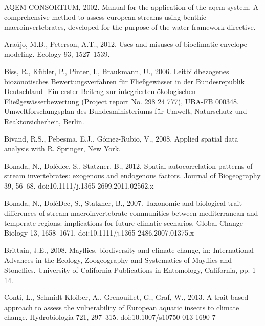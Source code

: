\openleft

\begingroup

\renewcommand{\addcontentsline}[3]{}%

\begin{thebibliography}

\bibitem{} \hangindent=1cm AQEM CONSORTIUM, 2002. Manual for the application of the aqem system. A comprehensive method to assess european streams using benthic macroinvertebrates, developed for the purpose of the water framework directive.

\bibitem{} \hangindent=1cm Araújo, M.B., Peterson, A.T., 2012. Uses and misuses of bioclimatic envelope modeling. Ecology 93, 1527–1539.

\bibitem{} \hangindent=1cm Biss, R., Kübler, P., Pinter, I., Braukmann, U., 2006. Leitbildbezogenes biozönotisches Bewertungsverfahren für Fließgewässer in der Bundesrepublik Deutschland -Ein erster Beitrag zur integrierten ökologischen Fließgewässerbewertung (Project report No. 298 24 777), UBA-FB 000348. Umweltforschungsplan des Bundesministeriums für Umwelt, Naturschutz und Reaktorsicherheit, Berlin.

\bibitem{} \hangindent=1cm Bivand, R.S., Pebesma, E.J., Gómez-Rubio, V., 2008. Applied spatial data analysis with R. Springer, New York.

\bibitem{} \hangindent=1cm Bonada, N., Dolédec, S., Statzner, B., 2012. Spatial autocorrelation patterns of stream invertebrates: exogenous and endogenous factors. Journal of Biogeography 39, 56–68. doi:10.1111/j.1365-2699.2011.02562.x

\bibitem{} \hangindent=1cm Bonada, N., DoléDec, S., Statzner, B., 2007. Taxonomic and biological trait differences of stream macroinvertebrate communities between mediterranean and temperate regions: implications for future climatic scenarios. Global Change Biology 13, 1658–1671. doi:10.1111/j.1365-2486.2007.01375.x

\bibitem{} \hangindent=1cm Brittain, J.E., 2008. Mayflies, biodiversity and climate change, in: International Advances in the Ecology, Zoogeography and Systematics of Mayflies and Stoneflies. University of California Publications in Entomology, California, pp. 1–14.

\bibitem{} \hangindent=1cm Conti, L., Schmidt-Kloiber, A., Grenouillet, G., Graf, W., 2013. A trait-based approach to assess the vulnerability of European aquatic insects to climate change. Hydrobiologia 721, 297–315. doi:10.1007/s10750-013-1690-7


\end{thebibliography}
